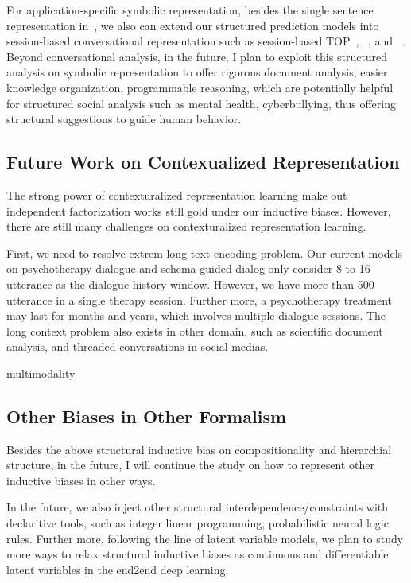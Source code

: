 For application-specific symbolic representation, besides the single
sentence representation
in~\cite[TOP,][]{gupta-etal-2018-semantic-parsing}, we also can extend
our structured prediction models into session-based conversational
representation such as session-based
TOP~\cite{aghajanyan2020conversational},
~\cite[TreeDST,][]{cheng2020conversational}, and
~\cite[Dataflow,][]{andreas2020task}.  Beyond conversational analysis,
in the future, I plan to exploit this structured analysis on symbolic
representation to offer rigorous document analysis, easier knowledge
organization, programmable reasoning, which are potentially helpful
for structured social analysis such as mental health, cyberbullying,
thus offering structural suggestions to guide human behavior.

\subsection{Future Work on Contexualized Representation}
\label{ssec:future:contextural-rep} The strong power of
contexturalized representation learning make out independent
factorization works still gold under our inductive biases. However,
there are still many challenges on contexturalized representation
learning.

 First, we need to resolve extrem long
text encoding problem. Our current models on psychotherapy dialogue
and schema-guided dialog only consider 8 to 16 utterance as the
dialogue history window. However, we have more than 500 utterance in a
single therapy session. Further more, a psychotherapy treatment may
last for months and years, which involves multiple dialogue
sessions. The long context problem also exists in other domain, such
as scientific document analysis, and threaded conversations in social
medias.

 multimodality

\subsection{Other Biases in Other Formalism}
\label{ssec:future:rep-bias-ways}

Besides the above structural inductive bias on compositionality and
hierarchial structure, in the future, I will continue the study on how
to represent other inductive biases in other ways.

In the
future, we also inject other structural interdependence/constraints
with declaritive tools, such as integer linear programming,
probabilistic neural logic rules. Further more, following the line of
latent variable models, we plan to study more ways to relax structural
inductive biases as continuous and differentiable latent variables in
the end2end deep learning.


